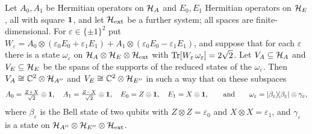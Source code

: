 \begin{lemma}\label{lem:rigidity}
Let $A_0,A_1$ be Hermitian operators on $\mathcal{H}_A$ and $E_0,E_1$ Hermitian operators on $\mathcal{H}_E$, all with square
$\mathbf{1}$, and let $\mathcal{H}_{\mathrm{ext}}$ be a further system; all spaces are finite-dimensional. For
$\varepsilon\in\{\pm1\}^2$ put
$W_\varepsilon=A_0\otimes(\varepsilon_0E_0+\varepsilon_1E_1)+A_1\otimes(\varepsilon_0E_0-\varepsilon_1E_1)$, and
suppose that for each $\varepsilon$ there is a state $\omega_\varepsilon$ on
$\mathcal{H}_A\otimes\mathcal{H}_E\otimes\mathcal{H}_{\mathrm{ext}}$ with
$\operatorname{Tr}[W_\varepsilon\,\omega_\varepsilon]=2\sqrt2$. Let $V_A\subseteq\mathcal{H}_A$ and $V_E\subseteq\mathcal{H}_E$ be the spans of
the supports of the reduced states of the $\omega_\varepsilon$. Then $V_A\cong\mathbb{C}^2\otimes\mathcal{H}_{A''}$ and
$V_E\cong\mathbb{C}^2\otimes\mathcal{H}_{E''}$ in such a way that on these subspaces
\[
A_0=\tfrac{Z+X}{\sqrt2}\otimes\mathbf{1},\quad A_1=\tfrac{Z-X}{\sqrt2}\otimes\mathbf{1},\quad E_0=Z\otimes\mathbf{1},\quad E_1=X\otimes\mathbf{1},
\qquad\text{and}\qquad \omega_\varepsilon=\lvert \beta_\varepsilon\rangle\!\langle \beta_\varepsilon\rvert\otimes\gamma_\varepsilon ,
\]
where $\beta_\varepsilon$ is the Bell state of two qubits with $Z\otimes Z=\varepsilon_0$ and
$X\otimes X=\varepsilon_1$, and $\gamma_\varepsilon$ is a state on
$\mathcal{H}_{A''}\otimes\mathcal{H}_{E''}\otimes\mathcal{H}_{\mathrm{ext}}$.
\end{lemma}

